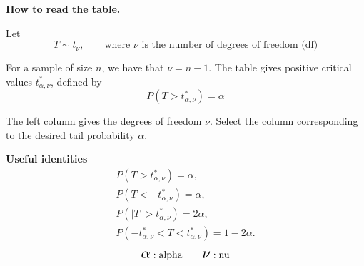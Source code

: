 \noindent
\begin{minipage}[t]{0.68\textwidth}
	\vspace{0pt}
	
	\textbf{How to read the table.}
	
	Let
	\vspace{-3mm}
	\[
	T\sim t_{\nu},
	\qquad
	\textrm{where } \nu \textrm{ is the number of degrees of freedom (df)}
	\]
	
	For a sample of size \(n\), we have that
	$
	\nu=n-1.
	$
	The table gives positive critical values \(t^*_{\alpha,\nu}\), defined by
	\[
	P\!\left(T>t^*_{\alpha,\nu}\right)=\alpha
	\]
	
	The left column gives the degrees of freedom \(\nu\). Select the column
	corresponding to the desired tail probability \(\alpha\).
	
	\vspace{2mm}
	
\end{minipage}%
\hfill
\begin{minipage}[t]{0.28\textwidth}
	\vspace{0pt}
	\centering
	\textbf{Useful identities}
	\vspace{-2mm}
	\begin{gather*}
		P\!\left(T>t^*_{\alpha,\nu}\right)=\alpha,\\
		P\!\left(T<-t^*_{\alpha,\nu}\right)=\alpha,\\
		P\!\left(|T|>t^*_{\alpha,\nu}\right)=2\alpha,\\
		P\!\left(-t^*_{\alpha,\nu}<T<t^*_{\alpha,\nu}\right)=1-2\alpha.
	\end{gather*}
	\[
	\scalebox{1.5}{$\alpha$} : \textrm{alpha}
	\qquad
	\scalebox{1.5}{$\nu$} : \textrm{nu}
	\]
	
\end{minipage}

\begin{center}
\end{center}


